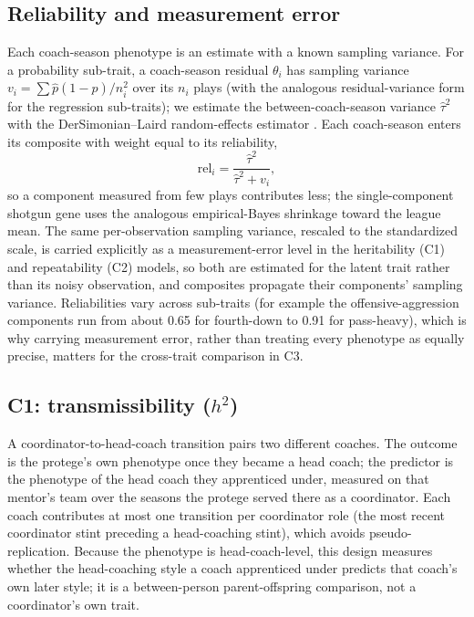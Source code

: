 \documentclass[11pt]{article}
\begin{document}
\subsection{Reliability and measurement error}
Each coach-season phenotype is an estimate with a known sampling variance. For a
probability sub-trait, a coach-season residual $\theta_i$ has sampling variance
$v_i = \sum \hat{p}(1-\hat{p})/n_i^2$ over its $n_i$ plays (with the analogous
residual-variance form for the regression sub-traits); we estimate the
between-coach-season variance $\hat{\tau}^2$ with the DerSimonian--Laird
random-effects estimator \citep{dersimonian1986}. Each coach-season enters its
composite with weight equal to its reliability,
\begin{equation}
  \mathrm{rel}_i = \frac{\hat{\tau}^2}{\hat{\tau}^2 + v_i},
\end{equation}
so a component measured from few plays contributes less; the single-component
shotgun gene uses the analogous empirical-Bayes shrinkage toward the league mean.
The same per-observation sampling variance, rescaled to the standardized scale, is
carried explicitly as a measurement-error level in the heritability (C1) and
repeatability (C2) models, so both are estimated for the latent trait rather than
its noisy observation, and composites propagate their components' sampling variance.
Reliabilities vary across sub-traits (for example the offensive-aggression
components run from about 0.65 for fourth-down to 0.91 for pass-heavy), which is why
carrying measurement error, rather than treating every phenotype as equally precise,
matters for the cross-trait comparison in C3.

\subsection{C1: transmissibility ($h^{2}$)}
A coordinator-to-head-coach transition pairs two different coaches. The outcome is
the protege's own phenotype once they became a head coach; the predictor is the
phenotype of the head coach they apprenticed under, measured on that mentor's team
over the seasons the protege served there as a coordinator. Each coach contributes
at most one transition per coordinator role (the most recent coordinator stint
preceding a head-coaching stint), which avoids pseudo-replication. Because the
phenotype is head-coach-level, this design measures whether the head-coaching style
a coach apprenticed under predicts that coach's own later style; it is a
between-person parent-offspring comparison, not a coordinator's own trait.
\end{document}
